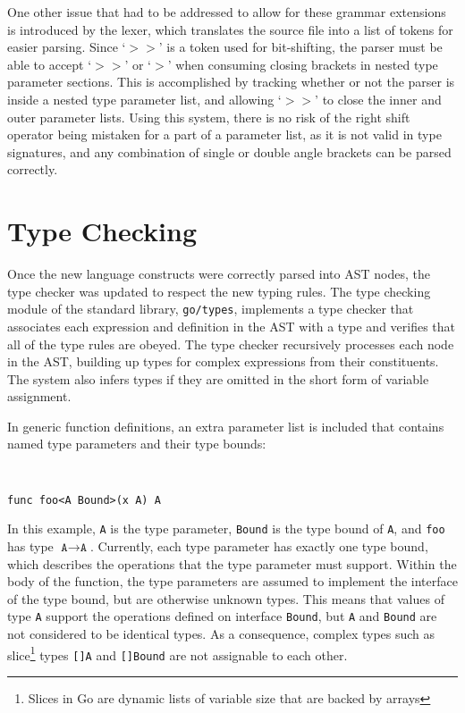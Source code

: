 \documentclass[letterpaper,11pt]{article}
\begin{document}
One other issue that had to be addressed to allow for these grammar extensions is introduced by the lexer, which translates the source file into a list of tokens for easier parsing. Since `\textbf{$>>$}' is a token used for bit-shifting, the parser must be able to accept `\textbf{$>>$}' or  `\textbf{$>$}' when consuming closing brackets in nested type parameter sections. This is accomplished by tracking whether or not the parser is inside a nested type parameter list, and allowing  `\textbf{$>>$}' to close the inner and outer parameter lists. Using this system, there is no risk of the right shift operator being mistaken for a part of a parameter list, as it is not valid in type signatures, and any combination of single or double angle brackets can be parsed correctly.

\section{Type Checking} \label{typechecking}

Once the new language constructs were correctly parsed into AST nodes, the type checker was updated to respect the new typing rules. The type checking module of the standard library, \texttt{go/types}, implements a type checker that associates each expression and definition in the AST with a type and verifies that all of the type rules are obeyed. The type checker recursively processes each node in the AST, building up types for complex expressions from their constituents. The system also infers types if they are omitted in the short form of variable assignment. 

In generic function definitions, an extra parameter list is included that contains named type parameters and their type bounds:

{ \tt \small
\begin{verbatim}
func foo<A Bound>(x A) A
\end{verbatim}
}

In this example, \texttt{A} is the type parameter, \texttt{Bound} is the type bound of \texttt{A}, and \texttt{foo} has type $\texttt{A} \rightarrow \texttt{A}$. Currently, each type parameter has exactly one type bound, which describes the operations that the type parameter must support. Within the body of the function, the type parameters are assumed to implement the interface of the type bound, but are otherwise unknown types. This means that values of type \texttt{A} support the operations defined on interface \texttt{Bound}, but \texttt{A} and \texttt{Bound} are not considered to be identical types. As a consequence, complex types such as slice\footnote{Slices in Go are dynamic lists of variable size that are backed by arrays} types \texttt{[]A} and \texttt{[]Bound} are not assignable to each other.
\end{document}
